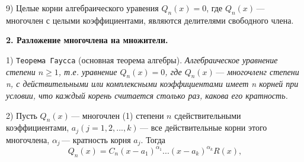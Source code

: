 \documentclass[a5paper, 16pt]{book}
\begin{document}
    \par9) Целые корни алгебраического уравения $Q_n (x) = 0$, где $Q_n (x) \, \textbf{---}$ многочлен с целыми коэффициентами, являются делителями свободного члена.
    \par\textbf{2. Разложение многочлена на множители.}
    \par1) \texttt{Теорема Гаусса} (основная теорема алгебры). \textit{Алгебраическое уравнение степени $n \geq 1$, т.е. уравнение $Q_n (x) = 0$, где $Q_n (x) \, \textbf{---}$ многочленг  степени n, с действительными или комплексными коэффициентами имеет n корней при условии, что каждый корень считается столько раз, какова его кратность.}
    \par2) Пусть $Q_n (x) \, \textbf{---}$ многочлен (1) степени $n$  сдействительными коэффициентами, $a_j (j = 1,2,...,k) \, \textbf{---}$ все действительные корни этого многочлена, $\alpha _j \, \textbf{---}$ кратность корня $a_j$. Тогда
    $$Q_n (x) = C_n (x - a_1) ^ {\alpha _1} ... (x - a_k) ^ {\alpha _k} R(x) ,$$
    
    \newpage
\end{document}
